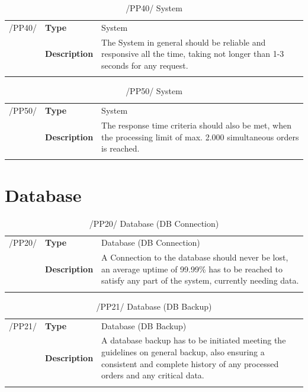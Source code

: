 \documentclass[11pt,a4paper,oneside,svgnames]{report}
\begin{document}
\begin{table}[H]
\centering
\begin{tabular}{llp{8.75cm}}
\cellcolor{white}/PP40/	& \textbf{Type}			& System\\
\cellcolor{white}		& \textbf{Description}	& The System in general should be reliable and responsive all the time, taking not longer than 1-3 seconds for any request.\\
\cellcolor{white}		\hfill \\
\end{tabular}
\caption{/PP40/ System}
\label{tab:pp40}
\end{table}

\begin{table}[H]
\centering
\begin{tabular}{llp{8.75cm}}
\cellcolor{white}/PP50/	& \textbf{Type}			& System\\
\cellcolor{white}		& \textbf{Description}	& The response time criteria should also be met, when the processing limit of max. 2.000 simultaneous orders is reached.\\
\cellcolor{white}		\hfill \\
\end{tabular}
\caption{/PP50/ System}
\label{tab:pp50}
\end{table}

\section{Database}

\begin{table}[H]
\centering
\begin{tabular}{llp{8.75cm}}
\cellcolor{white}/PP20/	& \textbf{Type}			& Database (DB Connection)\\
\cellcolor{white}		& \textbf{Description}	& A Connection to the database should never be lost, an average uptime of 99.99\% has to be reached to satisfy any part of the system, currently needing data.\\
\cellcolor{white}		\hfill \\
\end{tabular}
\caption{/PP20/ Database (DB Connection)}
\label{tab:pp20}
\end{table}

\begin{table}[H]
\centering
\begin{tabular}{llp{8.75cm}}
\cellcolor{white}/PP21/	& \textbf{Type}			& Database (DB Backup)\\
\cellcolor{white}		& \textbf{Description}	& A database backup has to be initiated meeting the guidelines on general backup, also ensuring a consistent and complete history of any processed orders and any critical data.\\
\cellcolor{white}		\hfill \\
\end{tabular}
\caption{/PP21/ Database (DB Backup)}
\label{tab:pp21}
\end{table}
\end{document}
